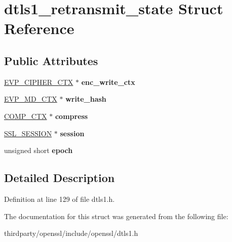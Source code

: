 \hypertarget{structdtls1__retransmit__state}{}\section{dtls1\+\_\+retransmit\+\_\+state Struct Reference}
\label{structdtls1__retransmit__state}
\subsection*{Public Attributes}
\begin{DoxyCompactItemize}
\item 
\mbox{\label{structdtls1__retransmit__state_ae1e9d630767c9f03cbbdf719fb84d05f}} 
\hyperlink{structevp__cipher__ctx__st}{E\+V\+P\+\_\+\+C\+I\+P\+H\+E\+R\+\_\+\+C\+TX} $\ast$ {\bfseries enc\+\_\+write\+\_\+ctx}
\item 
\mbox{\label{structdtls1__retransmit__state_aabb799421e4698d91594730ac7758f7a}} 
\hyperlink{structenv__md__ctx__st}{E\+V\+P\+\_\+\+M\+D\+\_\+\+C\+TX} $\ast$ {\bfseries write\+\_\+hash}
\item 
\mbox{\label{structdtls1__retransmit__state_a25bba837f21b15d59f3ce572f8255a24}} 
\hyperlink{structcomp__ctx__st}{C\+O\+M\+P\+\_\+\+C\+TX} $\ast$ {\bfseries compress}
\item 
\mbox{\label{structdtls1__retransmit__state_ad953293227cf8db42778e560516d160f}} 
\hyperlink{structssl__session__st}{S\+S\+L\+\_\+\+S\+E\+S\+S\+I\+ON} $\ast$ {\bfseries session}
\item 
\mbox{\label{structdtls1__retransmit__state_a8a8ac3e9aaaeee2fe91f54ad027f17a9}} 
unsigned short {\bfseries epoch}
\end{DoxyCompactItemize}


\subsection{Detailed Description}


Definition at line 129 of file dtls1.\+h.



The documentation for this struct was generated from the following file\+:\begin{DoxyCompactItemize}
\item 
thirdparty/openssl/include/openssl/dtls1.\+h\end{DoxyCompactItemize}

